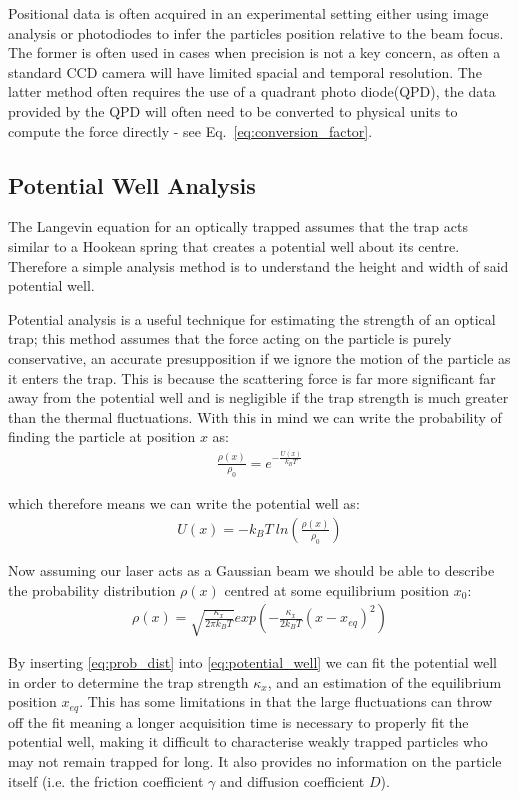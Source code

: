 Positional data is often acquired in an experimental setting either using
image analysis or photodiodes to infer the particles position relative to
the beam focus. The former is often used in cases when precision is not a 
key concern, as often a standard CCD camera will have limited spacial and 
temporal resolution. The latter method often requires the use of a quadrant
photo diode(QPD), the data provided by the QPD will often need to be converted
to physical units to compute the force directly - see Eq.~\eqref{eq:conversion_factor}.

\subsection{Potential Well Analysis}
The Langevin equation for an optically trapped assumes that the trap 
acts similar to a Hookean spring that creates a potential well about 
its centre. Therefore a simple analysis method is to understand the 
height and width of said potential well. 

Potential analysis is a useful technique for estimating the strength 
of an optical trap; this method assumes that the force acting on the 
particle is purely conservative, an accurate presupposition if we 
ignore the motion of the particle as it enters the trap. This is 
because the scattering force is far more significant far away from 
the potential well and is negligible if the trap strength is much 
greater than the thermal fluctuations. With this in mind we can 
write the probability of finding the particle at position $x$ as:
\begin{align}
	\frac{\rho(x)}{\rho_0} = e^{-\frac{U(x)}{k_{B}T}} 
\end{align}

which therefore means we can write the potential well as:
\begin{align}
	\label{eq:potential_well}
	U(x)=-k_BT\ ln\left(\frac{\rho(x)}{\rho_0} \right)
\end{align}

Now assuming our laser acts as a Gaussian beam we should be able 
to describe the probability distribution $\rho(x)$ centred at 
some equilibrium position $x_0$:
\begin{align}
	\label{eq:prob_dist}
	\rho(x)= \sqrt{\frac{\kappa_x}{2\pi k_BT}} exp\left(-\frac{\kappa_x}{2k_BT}(x-x_{eq})^2\right)
\end{align}

By inserting \eqref{eq:prob_dist} into \eqref{eq:potential_well} 
we can fit the potential well in order to determine the trap strength 
$\kappa_x$, and an estimation of the equilibrium position $x_{eq}$. 
This has some limitations in that the large fluctuations can throw 
off the fit meaning a longer acquisition time is necessary to properly 
fit the potential well, making it difficult to characterise weakly 
trapped particles who may not remain trapped for long. It also 
provides no information on the particle itself (i.e. the friction 
coefficient $\gamma$ and diffusion coefficient $D$).

